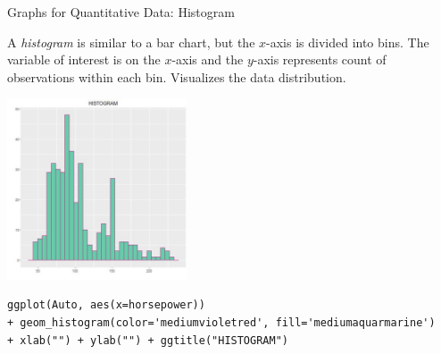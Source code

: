 \documentclass[xcolor=svgnames, 10pt, handout]{beamer}
\begin{document}
\begin{frame}[fragile]{Graphs for Quantitative Data: Histogram}
\begin{multicols}{2}

A \emph{histogram} is similar to a bar chart, but the $x$-axis is divided into bins.
\vfill
The variable of interest is on the $x$-axis and the $y$-axis represents count of observations within each bin.
\vfill
Visualizes the data distribution.
\vfill
\newpage

\includegraphics[width=0.4\textwidth]{images/hist}
\end{multicols}

\begin{Verbatim}[xleftmargin=.5em, xrightmargin=.5em, frame=single, label=Histogram Example, framesep=0.5em, fontsize=\small]
ggplot(Auto, aes(x=horsepower))
+ geom_histogram(color='mediumvioletred', fill='mediumaquarmarine')
+ xlab("") + ylab("") + ggtitle("HISTOGRAM")
\end{Verbatim}
\end{frame}
\end{document}
